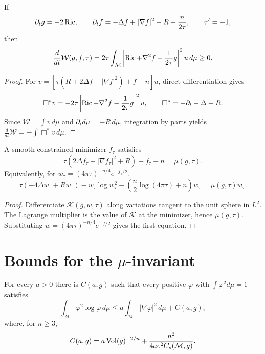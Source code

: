 \begin{theorem}
\label{thm:chow-iii-ch17-entropy-monotonicity}


If
\[
 \partial_tg=-2\operatorname{Ric},\qquad
 \partial_tf=-\Delta f+|\nabla f|^2-R+\frac n{2\tau},
 \qquad \tau'=-1,
\]
then
\[
 \frac d{dt}\mathcal W(g,f,\tau)=2\tau\int_{\mathcal M}
 \left|\operatorname{Ric}+\nabla^2f-\frac1{2\tau}g\right|^2u\,d\mu\ge0.
\]
\end{theorem}
\begin{proof}
\sketch For
$v=[\tau(R+2\Delta f-|\nabla f|^2)+f-n]u$, direct differentiation gives
\[
 \Box^*v=-2\tau\left|\operatorname{Ric}+\nabla^2f-\frac1{2\tau}g\right|^2u,
 \qquad \Box^*=-\partial_t-\Delta+R.
\]
Since $\mathcal W=\int v\,d\mu$ and $\partial_td\mu=-R\,d\mu$,
integration by parts yields $\frac d{dt}\mathcal W=-\int\Box^*v\,d\mu$.
\end{proof}

\begin{lemma}
\label{lem:chow-iii-ch17-entropy-minimizer-equation}


A smooth constrained minimizer $f_\tau$ satisfies
\[
 \tau(2\Delta f_\tau-|\nabla f_\tau|^2+R)+f_\tau-n=\mu(g,\tau).
\]
Equivalently, for $w_\tau=(4\pi\tau)^{-n/4}e^{-f_\tau/2}$,
\[
 \tau(-4\Delta w_\tau+Rw_\tau)-w_\tau\log w_\tau^2
 -\left(\frac n2\log(4\pi\tau)+n\right)w_\tau
 =\mu(g,\tau)w_\tau.
\]
\end{lemma}
\begin{proof}
\sketch Differentiate $\mathcal K(g,w,\tau)$ along variations tangent to the unit
sphere in $L^2$.  The Lagrange multiplier is the value of $\mathcal K$ at
the minimizer, hence $\mu(g,\tau)$.  Substituting
$w=(4\pi\tau)^{-n/4}e^{-f/2}$ gives the first equation.
\end{proof}

\section{Bounds for the \texorpdfstring{$\mu$}{mu}-invariant}

\begin{lemma}
\label{lem:chow-iii-ch17-logarithmic-sobolev}

For every $a>0$ there is $C(a,g)$ such that every positive $\varphi$ with
$\int\varphi^2d\mu=1$ satisfies
\[
 \int_{\mathcal M}\varphi^2\log\varphi\,d\mu
 \le a\int_{\mathcal M}|\nabla\varphi|^2\,d\mu+C(a,g),
\]
where, for $n\ge3$,
\[
 C(a,g)=a\operatorname{Vol}(g)^{-2/n}+\frac{n^2}{4ae^2C_s(\mathcal M,g)}.
\]
\end{lemma}

